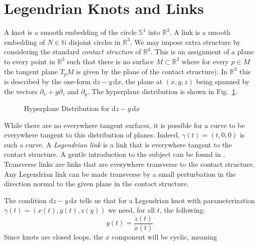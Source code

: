 \documentclass{article}
\theoremstyle{plain}
\begin{document}
    \section{Legendrian Knots and Links}
        A knot is a smooth embedding of the circle $\mathbb{S}^{1}$ into
        $\mathbb{R}^{3}$. A link is a smooth embedding of $N\in\mathbb{N}$
        disjoint circles in $\mathbb{R}^{3}$. We may impose
        extra structure by considering the standard \textit{contact structure}
        of $\mathbb{R}^{3}$. This is an assignment
        of a plane to every point in $\mathbb{R}^{3}$ such that there is no
        surface $M\subset\mathbb{R}^{3}$ where for every $p\in{M}$ the tangent
        plane $T_{p}M$ is given by the plane of the contact structure). In
        $\mathbb{R}^{3}$ this is described by the one-form
        $\textrm{d}z-y\,\textrm{d}x$, the plane at $(x,y,z)$ being spanned by
        the vectors $\partial_{x}+y\partial_{z}$ and $\partial_{y}$. The
        hyperplane distribution is shown in Fig.~\ref{fig:darboux_form_001}.
        \begin{figure}
            \centering
            \caption{Hyperplane Distribution for $\textrm{d}z-y\,\textrm{d}x$}
            \label{fig:darboux_form_001}
        \end{figure}
        While there are no everywhere tangent surfaces, it is possible for a
        curve to be everywhere tangent to this distribution of planes. Indeed,
        $\gamma(t)=(t,0,0)$ is such a curve.
        A \textit{Legendrian link} is a link that is everywhere tangent to
        the contact structure. A gentle introduction to the subject can be found
        in \cite{JoshuaMSabloffWhatIsLegendrianKnot}. Transverse links are links
        that are everywhere transverse to the contact structure. Any Legendrian
        link can be made transverse by a small perturbation in the direction
        normal to the given plane in the contact structure.
        \par\hfill\par
        The condition $\textrm{d}z-y\,\textrm{d}x$ tells us that for a
        Legendrian knot with parameterization $\gamma(t)=(x(t),y(t),z(y))$ we
        need, for all $t$, the following:
        \begin{equation}
            y(t)=\frac{\dot{z}(t)}{\dot{x}(t)}
        \end{equation}
        Since knots are closed loops, the $x$ component will be cyclic, meaning
\end{document}
